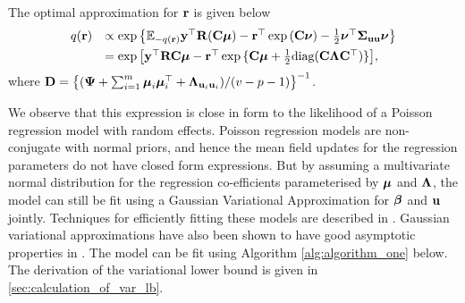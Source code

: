 
The optimal approximation for ${\bf r}$ is given below %
\begin{equation}
\label{eq:optimal_approximation}
\begin{array}{rl}
	q({\bf r}) & \propto \exp \left \{ {\mathbb E}_{-q({\bf r})}{\bf y}^\top{\bf R}({\bf C}{\boldsymbol \mu}) - {\bf r}^\top\exp{({\bf C}{\boldsymbol\nu})}-\frac{1}{2} {\boldsymbol \nu}^\top {\boldsymbol\Sigma}_{{\bf u} {\bf u}} {\boldsymbol \nu} \right \}                                                  \\ [1ex]
	       & = \exp{ \left[ {\bf y}^\top{\bf R}{\bf C}{\boldsymbol\mu}- {\bf r}^\top \exp{\{{\bf C}{\boldsymbol\mu}+ \frac{1}{2} \text{diag}({\bf C}{\boldsymbol\Lambda}{\bf C}^\top)\}} \right] }, 
\end{array}
\end{equation}
\noindent where ${\bf D} = \left\{ ({\boldsymbol \Psi} + \sum_{i=1}^m {\boldsymbol \mu}_i {\boldsymbol \mu}_i^\top + {\boldsymbol \Lambda}_{{\bf u}_i{\bf u}_i}) / (v - p - 1) \right\}^{-1}$.

We observe that this expression is close in form to the likelihood of a Poisson
regression model with random effects. Poisson regression models are
non-conjugate with normal priors, and hence the mean field updates for the
regression parameters do not have closed form expressions. But by assuming a
multivariate normal distribution for the regression co-efficients parameterised
by ${\boldsymbol \mu}$ and ${\boldsymbol \Lambda}$, the model can still be fit using a Gaussian
Variational Approximation for ${\boldsymbol \beta}$ and ${\bf u}$ jointly. Techniques for
efficiently fitting these models are described in \cite{Ormerod2012,
Challis2013, Opper2009}. Gaussian variational approximations have also been
shown to have good asymptotic properties in \cite{Sinica2017}. The model can be
fit using Algorithm \ref{alg:algorithm_one} below. The derivation of the
variational lower bound is given in \ref{sec:calculation_of_var_lb}.


